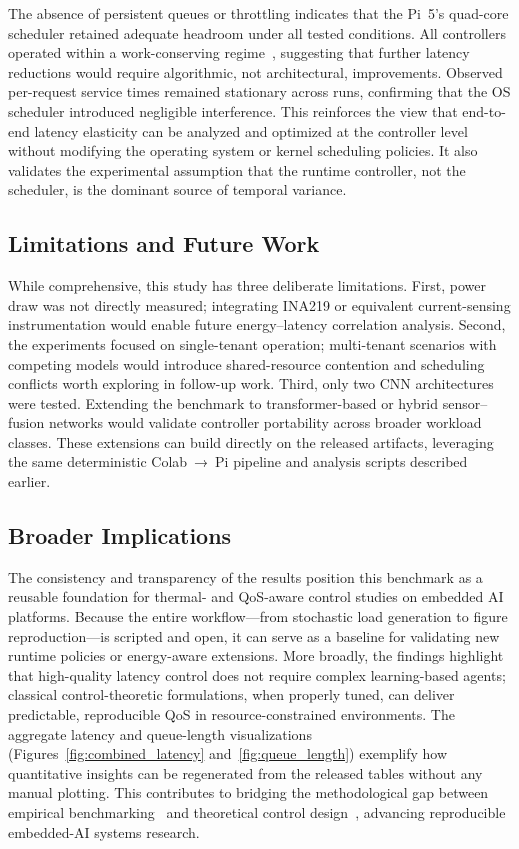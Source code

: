 \documentclass[acmsmall]{acmart}
\begin{document}
The absence of persistent queues or throttling indicates that the Pi~5’s quad-core scheduler retained adequate headroom under all tested conditions.  
All controllers operated within a work-conserving regime~\cite{kleinrock1975queueing}, suggesting that further latency reductions would require algorithmic, not architectural, improvements.  
Observed per-request service times remained stationary across runs, confirming that the OS scheduler introduced negligible interference.  
This reinforces the view that end-to-end latency elasticity can be analyzed and optimized at the controller level without modifying the operating system or kernel scheduling policies.  
It also validates the experimental assumption that the runtime controller, not the scheduler, is the dominant source of temporal variance.

\subsection{Limitations and Future Work}

While comprehensive, this study has three deliberate limitations.  
First, power draw was not directly measured; integrating INA219 or equivalent current-sensing instrumentation would enable future energy–latency correlation analysis.  
Second, the experiments focused on single-tenant operation; multi-tenant scenarios with competing models would introduce shared-resource contention and scheduling conflicts worth exploring in follow-up work.  
Third, only two CNN architectures were tested.  
Extending the benchmark to transformer-based or hybrid sensor–fusion networks would validate controller portability across broader workload classes.  
These extensions can build directly on the released artifacts, leveraging the same deterministic Colab~→~Pi pipeline and analysis scripts described earlier.

\subsection{Broader Implications}

The consistency and transparency of the results position this benchmark as a reusable foundation for thermal- and QoS-aware control studies on embedded AI platforms.  
Because the entire workflow—from stochastic load generation to figure reproduction—is scripted and open, it can serve as a baseline for validating new runtime policies or energy-aware extensions.  
More broadly, the findings highlight that high-quality latency control does not require complex learning-based agents; classical control-theoretic formulations, when properly tuned, can deliver predictable, reproducible QoS in resource-constrained environments.  
The aggregate latency and queue-length visualizations (Figures~\ref{fig:combined_latency} and~\ref{fig:queue_length}) exemplify how quantitative insights can be regenerated from the released tables without any manual plotting.  
This contributes to bridging the methodological gap between empirical benchmarking~\cite{reddi2020mlperf, banbury2021mlperf} and theoretical control design~\cite{astrom2008feedback}, advancing reproducible embedded-AI systems research.
\end{document}
